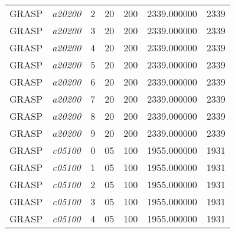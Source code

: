 {\begin{longtable}{cc|c|cc|cc}
			GRASP              & \textit{a20200}    & 2                               & 20               & 200              & 2339.000000                          & 2339 \\ 
			GRASP              & \textit{a20200}    & 3                               & 20               & 200              & 2339.000000                          & 2339 \\ 
			GRASP              & \textit{a20200}    & 4                               & 20               & 200              & 2339.000000                          & 2339 \\ 
			GRASP              & \textit{a20200}    & 5                               & 20               & 200              & 2339.000000                          & 2339 \\ 
			GRASP              & \textit{a20200}    & 6                               & 20               & 200              & 2339.000000                          & 2339 \\ 
			GRASP              & \textit{a20200}    & 7                               & 20               & 200              & 2339.000000                          & 2339 \\ 
			GRASP              & \textit{a20200}    & 8                               & 20               & 200              & 2339.000000                          & 2339 \\ 
			GRASP              & \textit{a20200}    & 9                               & 20               & 200              & 2339.000000                          & 2339 \\ \hline
			GRASP              & \textit{c05100}    & 0                               & 05               & 100              & 1955.000000                          & 1931 \\ 
			GRASP              & \textit{c05100}    & 1                               & 05               & 100              & 1955.000000                          & 1931 \\ 
			GRASP              & \textit{c05100}    & 2                               & 05               & 100              & 1955.000000                          & 1931 \\ 
			GRASP              & \textit{c05100}    & 3                               & 05               & 100              & 1955.000000                          & 1931 \\ 
			GRASP              & \textit{c05100}    & 4                               & 05               & 100              & 1955.000000                          & 1931 \\ 

\end{longtable}}
